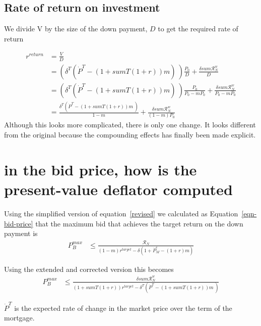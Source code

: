 \subsection{Rate of return on investment}
We divide V by the size of the down payment, $D$ to get the required rate of return  

\begin{align}
r^{return} 
  &= \frac{V}{D}  \nonumber \\
  &= \left(\delta^T \left(\dot P^T - (1 + sumT(1+r))m\right) \ \right) \frac{P_0}{D}  + \frac{\delta sum\mathcal{R}^w_N}{D}      \nonumber \\
  &= \left(\delta^T \left(\dot P^T - (1 + sumT(1+r))m \right) \ \right)\frac{P_0}{P_0-mP_0} +  \frac{\delta sum\mathcal{R}^w_N }{P_0-mP_0}  \\ 
  &= \frac{\delta^T \left(\dot P^T - (1 + sumT(1+r))m\ \right) }{1-m} +\frac{\delta sum\mathcal{R}^w_N }{(1-m)P_0}\label{revised}
\end{align}
Although this looks more complicated, there is only one change. It looks different from the original because the compounding effects has finally been made explicit.



\section{in the bid price, how is the present-value deflator computed}

Using the simplified version of equation~\ref{revised} we  calculated  as Equation~\ref{eqn-bid-price} that the maximum bid that achieves the target return on the down payment is
\begin{align*}
P_B^{max} & \le    \frac{\mathcal{R}_N}{(1-m)r^{target}-\delta \left(1 + \dot P_M^e - (1+r)m\right)}  \end{align*}

Using the extended and corrected version this becomes
\begin{align}
P_B^{max} & \le    \frac{\delta sum\mathcal{R}^w_N } {(1 + sumT(1+r))r^{target}-\delta^T \left(\dot P^T - (1 + sumT(1+r))m\ \right)} \label{eqn-bid-revised} \end{align}

$\dot P^T$  is the expected rate of change in the market price over the term of the mortgage.